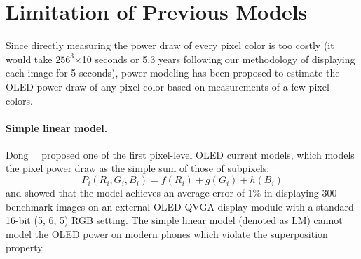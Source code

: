 \section{Limitation of Previous Models}
\label{sec:non_linear}

Since directly measuring the power draw of every pixel color is too
costly (\eg it would take $256^3$$\times$10 seconds or 5.3 years following
our methodology of displaying each image for 5 seconds), power modeling has been proposed to estimate the OLED
power draw of any pixel color based on measurements of a few pixel colors.



\paragraph{Simple linear model.}
\label{subsec:LM}
Dong~\etal~\cite{dong2009current} proposed one of the first pixel-level OLED current models,
which models the pixel power draw as the simple sum of
those of subpixels:
\begin{equation}
	P_i(R_i, G_i,B_i) = f(R_{i}) + g(G_{i}) + h(B_{i})
	\label{eq:linear_equation}
\end{equation}
and showed that the model  achieves an average 
error of 1\% in
displaying 300 benchmark images on an external OLED QVGA display
module with a standard 16-bit (5, 6, 5) RGB setting.
%
The simple linear model (denoted as LM) cannot model the OLED power on modern phones
which violate the superposition property.




